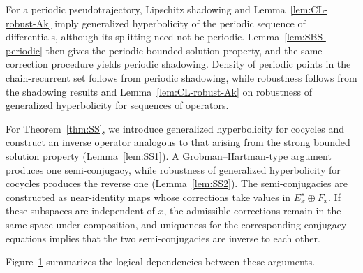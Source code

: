 \documentclass[12pt]{article}
\theoremstyle{definition}
\begin{document}
For a periodic pseudotrajectory, Lipschitz shadowing and Lemma~\ref{lem:CL-robust-Ak} imply generalized hyperbolicity of the periodic sequence of differentials, although its splitting need not be periodic.
Lemma~\ref{lem:SBS-periodic} then gives the periodic bounded solution property, and the same correction procedure yields periodic shadowing. Density of periodic points in the chain-recurrent set follows from periodic shadowing, while robustness follows from the shadowing results and Lemma~\ref{lem:CL-robust-Ak} on robustness of generalized hyperbolicity for sequences of operators.


For Theorem~\ref{thm:SS}, we introduce generalized hyperbolicity for cocycles and construct an inverse operator analogous to that arising from the strong bounded solution property (Lemma~\ref{lem:SS1}).
A Grobman--Hartman-type argument produces one semi-conjugacy, while robustness of generalized hyperbolicity for cocycles produces the reverse one (Lemma~\ref{lem:SS2}).
The semi-conjugacies are constructed as near-identity maps whose corrections take values in $E_x^s\oplus F_x$. If these subspaces are independent of $x$, the admissible corrections remain in the same space under composition, and uniqueness for the corresponding conjugacy equations implies that the two semi-conjugacies are inverse to each other.

Figure~\ref{fig:roadmap} summarizes the logical dependencies between these arguments.

\begin{figure}[omitted: a diagram of this paper's results, not reproduced here]\label{fig:roadmap}\end{figure}
\end{document}
